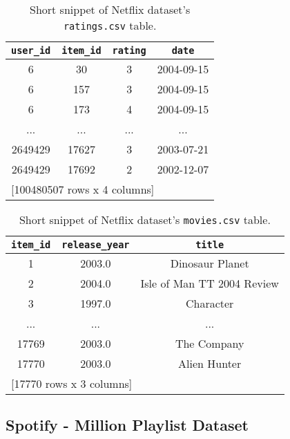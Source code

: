 \begin{table}[!ht]
    \centering
    \begin{tabular}{ c c c c }
        \verb|user_id| & \verb|item_id| & \verb|rating| & \verb|date| \\
        \hline
              6 &             30 &             3 &  2004-09-15 \\
              6 &            157 &             3 &  2004-09-15 \\
              6 &            173 &             4 &  2004-09-15 \\
            ... &            ... &           ... &         ... \\
        2649429 &          17627 &             3 &  2003-07-21 \\
        2649429 &          17692 &             2 &  2002-12-07 \\ [1mm]
        \multicolumn{4}{l}{{[100480507 rows x 4 columns]}}
    \end{tabular}
    \caption{Short snippet of Netflix dataset's \texttt{ratings.csv} table.}
    \label{table:5.1_Netflix_ratings}
\end{table}
    
\begin{table}[!ht]
    \centering
    \begin{tabular}{ c c c }
        \verb|item_id| & \verb|release_year| & \verb|title| \\
        \hline
            1 &       2003.0 &            Dinosaur Planet    \\
            2 &       2004.0 & Isle of Man TT 2004 Review    \\
            3 &       1997.0 &                  Character    \\
          ... &          ... &                        ...    \\
        17769 &       2003.0 &                The Company    \\
        17770 &       2003.0 &               Alien Hunter \\ [1mm]
        \multicolumn{3}{l}{{[17770 rows x 3 columns]}}
    \end{tabular}
    \caption{Short snippet of Netflix dataset's \texttt{movies.csv} table.}
    \label{table:5.1_Netflix_movies}
\end{table}

\subsection{Spotify - Million Playlist Dataset}

